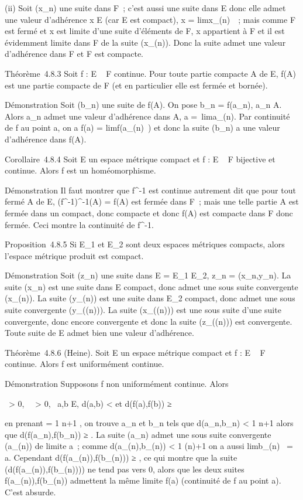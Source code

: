 \documentclass[]{article}
\begin{document}
(ii) Soit (x_n) une suite dans F~; c'est aussi une suite dans E
donc elle admet une valeur d'adhérence x \in E (car E est compact), x
= limx_\phi(n)~~; mais comme F est fermé
et x est limite d'une suite d'éléments de F, x appartient à F et il est
évidemment limite dans F de la suite (x_\phi(n)). Donc la suite
admet une valeur d'adhérence dans F et F est compacte.

Théorème~4.8.3 Soit f : E \rightarrow~ F continue. Pour toute partie compacte A de
E, f(A) est une partie compacte de F (et en particulier elle est fermée
et bornée).

Démonstration Soit (b_n) une suite de f(A). On pose
b_n = f(a_n), a_n \in A. Alors a_n
admet une valeur d'adhérence dans A, a =\
lima_\phi(n). Par continuité de f au point a, on a f(a)
= limf(a_\phi(n)~) et donc la suite
(b_n) a une valeur d'adhérence dans f(A).

Corollaire~4.8.4 Soit E un espace métrique compact et f : E \rightarrow~ F
bijective et continue. Alors f est un homéomorphisme.

Démonstration Il faut montrer que f^-1 est continue autrement
dit que pour tout fermé A de E, (f^-1)^-1(A) =
f(A) est fermée dans F~; mais une telle partie A est fermée dans un
compact, donc compacte et donc f(A) est compacte dans F donc fermée.
Ceci montre la continuité de f^-1.

Proposition~4.8.5 Si E_1 et E_2 sont deux espaces
métriques compacts, alors l'espace métrique produit est compact.

Démonstration Soit (z_n) une suite dans E = E_1 \times
E_2, z_n = (x_n,y_n). La suite
(x_n) est une suite dans E compact, donc admet une sous suite
convergente (x_\phi(n)). La suite (y_\phi(n)) est une suite
dans E_2 compact, donc admet une sous suite convergente
(y_\phi(\psi(n))). La suite (x_\phi(\psi(n))) est une sous suite
d'une suite convergente, donc encore convergente et donc la suite
(z_\phi(\psi(n))) est convergente. Toute suite de E admet bien une
valeur d'adhérence.

Théorème~4.8.6 (Heine). Soit E un espace métrique compact et f : E \rightarrow~ F
continue. Alors f est uniformément continue.

Démonstration Supposons f non uniformément continue. Alors

\exists~\epsilon > 0,
\forall~~\eta > 0,\quad
\exists~a,b \in E, d(a,b) <
\eta\text et d(f(a),f(b)) ≥ \epsilon

en prenant \eta = 1 \over n+1 , on trouve a_n
et b_n tels que d(a_n,b_n) < 1
\over n+1 alors que d(f(a_n),f(b_n))
≥ \epsilon. La suite (a_n) admet une sous suite convergente
(a_\phi(n)) de limite a~; comme d(a_\phi(n),b_\phi(n))
< 1 \over \phi(n)+1 on a aussi
limb_\phi(n)~ = a. Cependant
d(f(a_\phi(n)),f(b_\phi(n))) ≥ \epsilon, ce qui montre que la suite
(d(f(a_\phi(n)),f(b_\phi(n)))) ne tend pas vers 0, alors que
les deux suites f(a_\phi(n)),f(b_\phi(n)) admettent la même
limite f(a) (continuité de f au point a). C'est absurde.
\end{document}
